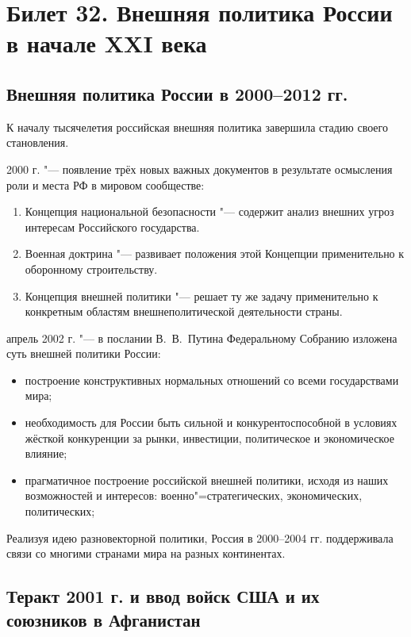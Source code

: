 \section{Билет 32. Внешняя политика России в начале XXI века}

\subsection{Внешняя политика России в 2000--2012 гг.}
К началу тысячелетия российская внешняя политика завершила стадию своего становления.

2000 г. "--- появление трёх новых важных документов в результате осмысления роли и места РФ в мировом сообществе:

\begin{enumerate}
\item Концепция национальной безопасности "--- содержит анализ внешних угроз интересам Российского государства.
\item Военная доктрина "--- развивает положения этой Концепции применительно к оборонному строительству.
\item Концепция внешней политики "--- решает ту же задачу применительно к конкретным областям внешнеполитической деятельности страны.
\end{enumerate}

апрель 2002 г. "--- в послании В.~В.~Путина Федеральному Собранию изложена суть внешней политики России:

\begin{itemize}
\item построение конструктивных нормальных отношений со всеми государствами мира;
\item необходимость для России быть сильной и конкурентоспособной в условиях жёсткой конкуренции за рынки, инвестиции, политическое и экономическое влияние;
\item прагматичное построение российской внешней политики, исходя из наших возможностей и интересов: военно"=стратегических, экономических, политических;
\end{itemize}

Реализуя идею разновекторной политики, Россия в 2000--2004 гг. поддерживала связи со многими странами мира на разных континентах.

\subsection{Теракт 2001 г. и ввод войск США и их союзников в Афганистан}

